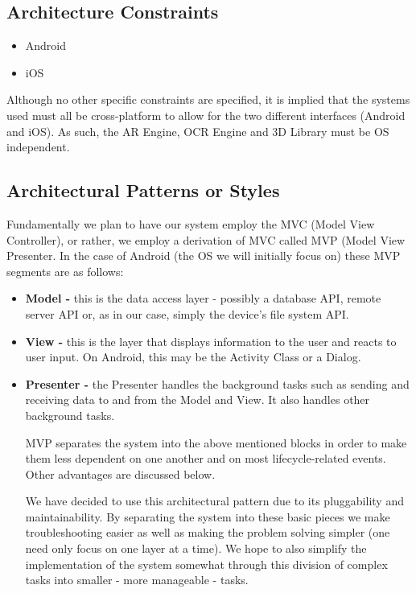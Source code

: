 \documentclass[a4paper,12pt]{article}
\begin{document}
\subsection{Architecture Constraints}
\begin{itemize}
	\item Android
	\item iOS
\end{itemize}
Although no other specific constraints are specified, it is implied that the systems used must all be cross-platform to allow for the two different interfaces (Android and iOS). As such, the AR Engine, OCR Engine and 3D Library must be OS independent.

\subsection{Architectural Patterns or Styles}
Fundamentally we plan to have our system employ the MVC (Model View Controller), or rather, we employ a derivation of MVC called MVP (Model View Presenter.
In the case of Android (the OS we will initially focus on) these MVP segments are as follows:
\begin{itemize}
	\item \textbf{Model -} this is the data access layer - possibly a database API, remote server API or, as in our case, simply the device's file system API.
	\item\textbf{View -} this is the layer that displays information to the user and reacts to user input. On Android, this may be the Activity Class or a Dialog.
	\item \textbf{Presenter -} the Presenter handles the background tasks such as sending and receiving data to and from the Model and View. It also handles other background tasks.
	
MVP separates the system into the above mentioned blocks in order to make them less dependent on one another and on most lifecycle-related events. Other advantages are discussed below.

We have decided to use this architectural pattern due to its pluggability and maintainability. By separating the system into these basic pieces we make troubleshooting easier as well as making the problem solving simpler (one need only focus on one layer at a time). We hope to also simplify the implementation of the system somewhat through this division of complex tasks into smaller - more manageable - tasks.
\end{itemize}
\end{document}
